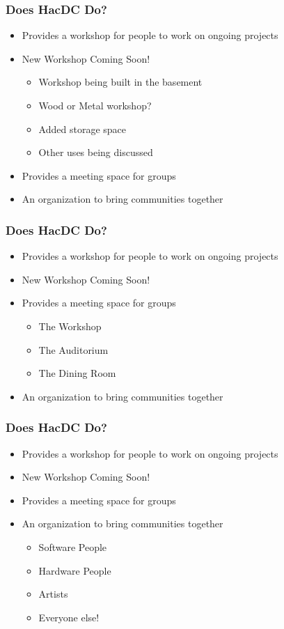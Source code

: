 \documentclass[notes]{beamer}
\begin{document}
\begin{frame}
  \frametitle{Does HacDC Do?}
  \begin{itemize}
  \item Provides a workshop for people to work on ongoing projects
  \item New Workshop Coming Soon!
    \begin{itemize}
    \item Workshop being built in the basement
    \item Wood or Metal workshop?
    \item Added storage space
    \item Other uses being discussed
    \end{itemize}
  \item Provides a meeting space for groups
  \item An organization to bring communities together
  \end{itemize}
\end{frame}

\begin{frame}
  \frametitle{Does HacDC Do?}
  \begin{itemize}
  \item Provides a workshop for people to work on ongoing projects
  \item New Workshop Coming Soon!
  \item Provides a meeting space for groups
    \begin{itemize}
    \item The Workshop
    \item The Auditorium
    \item The Dining Room
    \end{itemize}
  \item An organization to bring communities together
  \end{itemize}
\end{frame}

\begin{frame}
  \frametitle{Does HacDC Do?}
  \begin{itemize}
  \item Provides a workshop for people to work on ongoing projects
  \item New Workshop Coming Soon!
  \item Provides a meeting space for groups
  \item An organization to bring communities together
    \begin{itemize}
    \item Software People
    \item Hardware People
    \item Artists
    \item Everyone else!
    \end{itemize}
  \end{itemize}
\end{frame}



\end{document}
